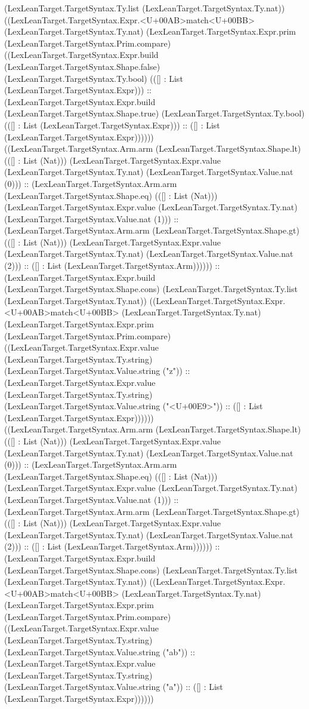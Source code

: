 \documentclass[11pt]{article}
\begin{document}
(LexLeanTarget.TargetSyntax.Ty.list (LexLeanTarget.TargetSyntax.Ty.nat)) ((LexLeanTarget.TargetSyntax.Expr.<U+00AB>match<U+00BB> (LexLeanTarget.TargetSyntax.Ty.nat) (LexLeanTarget.TargetSyntax.Expr.prim (LexLeanTarget.TargetSyntax.Prim.compare) ((LexLeanTarget.TargetSyntax.Expr.build (LexLeanTarget.TargetSyntax.Shape.false) (LexLeanTarget.TargetSyntax.Ty.bool) (([] : List (LexLeanTarget.TargetSyntax.Expr))) :: (LexLeanTarget.TargetSyntax.Expr.build (LexLeanTarget.TargetSyntax.Shape.true) (LexLeanTarget.TargetSyntax.Ty.bool) (([] : List (LexLeanTarget.TargetSyntax.Expr))) :: ([] : List (LexLeanTarget.TargetSyntax.Expr)))))) ((LexLeanTarget.TargetSyntax.Arm.arm (LexLeanTarget.TargetSyntax.Shape.lt) (([] : List (Nat))) (LexLeanTarget.TargetSyntax.Expr.value (LexLeanTarget.TargetSyntax.Ty.nat) (LexLeanTarget.TargetSyntax.Value.nat (0))) :: (LexLeanTarget.TargetSyntax.Arm.arm (LexLeanTarget.TargetSyntax.Shape.eq) (([] : List (Nat))) (LexLeanTarget.TargetSyntax.Expr.value (LexLeanTarget.TargetSyntax.Ty.nat) (LexLeanTarget.TargetSyntax.Value.nat (1))) :: (LexLeanTarget.TargetSyntax.Arm.arm (LexLeanTarget.TargetSyntax.Shape.gt) (([] : List (Nat))) (LexLeanTarget.TargetSyntax.Expr.value (LexLeanTarget.TargetSyntax.Ty.nat) (LexLeanTarget.TargetSyntax.Value.nat (2))) :: ([] : List (LexLeanTarget.TargetSyntax.Arm)))))) :: (LexLeanTarget.TargetSyntax.Expr.build (LexLeanTarget.TargetSyntax.Shape.cons) (LexLeanTarget.TargetSyntax.Ty.list (LexLeanTarget.TargetSyntax.Ty.nat)) ((LexLeanTarget.TargetSyntax.Expr.<U+00AB>match<U+00BB> (LexLeanTarget.TargetSyntax.Ty.nat) (LexLeanTarget.TargetSyntax.Expr.prim (LexLeanTarget.TargetSyntax.Prim.compare) ((LexLeanTarget.TargetSyntax.Expr.value (LexLeanTarget.TargetSyntax.Ty.string) (LexLeanTarget.TargetSyntax.Value.string ("z")) :: (LexLeanTarget.TargetSyntax.Expr.value (LexLeanTarget.TargetSyntax.Ty.string) (LexLeanTarget.TargetSyntax.Value.string ("<U+00E9>")) :: ([] : List (LexLeanTarget.TargetSyntax.Expr)))))) ((LexLeanTarget.TargetSyntax.Arm.arm (LexLeanTarget.TargetSyntax.Shape.lt) (([] : List (Nat))) (LexLeanTarget.TargetSyntax.Expr.value (LexLeanTarget.TargetSyntax.Ty.nat) (LexLeanTarget.TargetSyntax.Value.nat (0))) :: (LexLeanTarget.TargetSyntax.Arm.arm (LexLeanTarget.TargetSyntax.Shape.eq) (([] : List (Nat))) (LexLeanTarget.TargetSyntax.Expr.value (LexLeanTarget.TargetSyntax.Ty.nat) (LexLeanTarget.TargetSyntax.Value.nat (1))) :: (LexLeanTarget.TargetSyntax.Arm.arm (LexLeanTarget.TargetSyntax.Shape.gt) (([] : List (Nat))) (LexLeanTarget.TargetSyntax.Expr.value (LexLeanTarget.TargetSyntax.Ty.nat) (LexLeanTarget.TargetSyntax.Value.nat (2))) :: ([] : List (LexLeanTarget.TargetSyntax.Arm)))))) :: (LexLeanTarget.TargetSyntax.Expr.build (LexLeanTarget.TargetSyntax.Shape.cons) (LexLeanTarget.TargetSyntax.Ty.list (LexLeanTarget.TargetSyntax.Ty.nat)) ((LexLeanTarget.TargetSyntax.Expr.<U+00AB>match<U+00BB> (LexLeanTarget.TargetSyntax.Ty.nat) (LexLeanTarget.TargetSyntax.Expr.prim (LexLeanTarget.TargetSyntax.Prim.compare) ((LexLeanTarget.TargetSyntax.Expr.value (LexLeanTarget.TargetSyntax.Ty.string) (LexLeanTarget.TargetSyntax.Value.string ("ab")) :: (LexLeanTarget.TargetSyntax.Expr.value (LexLeanTarget.TargetSyntax.Ty.string) (LexLeanTarget.TargetSyntax.Value.string ("a")) :: ([] : List (LexLeanTarget.TargetSyntax.Expr)))))) 
\end{document}
